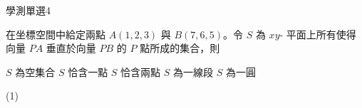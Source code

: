     \begin{QUESTION}
        \begin{ExamInfo}{93}{學測}{單選}{4}
        \end{ExamInfo}
        \begin{ExamAnsRateInfo}{23}{42}{17}{10}
        \end{ExamAnsRateInfo}
        \begin{QBODY}
            在坐標空間中給定兩點 $A(1,2,3)$ 與 $B(7,6,5)$。令 $S$ 為 $xy$- 平面上所有使得向量 $PA$ 垂直於向量 $PB$ 的 $P$ 點所成的集合，則
            \begin{QOPS} 
                \QOP $S$ 為空集合 
                \QOP $S$ 恰含一點 
                \QOP $S$ 恰含兩點 
                \QOP $S$ 為一線段 
                \QOP $S$ 為一圓
            \end{QOPS}
        \end{QBODY}
        \begin{QFROMS}
        \end{QFROMS}
        \begin{QTAGS}\end{QTAGS}
        \begin{QANS}
            (1)
        \end{QANS}
        \begin{QSOLLIST}
        \end{QSOLLIST}
        \begin{QEMPTYSPACE}
        \end{QEMPTYSPACE}
    \end{QUESTION}
